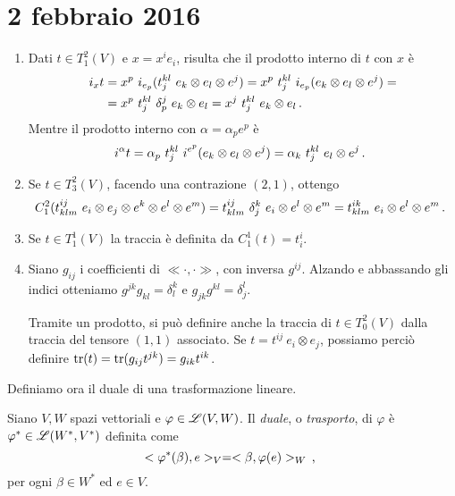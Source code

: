 \chapter{2 febbraio 2016}

\begin{example}
	\begin{enumerate}
		\item Dati $t\in T_1^2(V)$ e $x=x^ie_i$, risulta che il prodotto interno di $t$ con $x$ è 
		\begin{align*}
		i_xt &= x^p\ i_{e_p}(t_j^{kl}\ e_k\otimes e_l\otimes e^j) = x^p\ t_j^{kl}\ i_{e_p} (e_k\otimes e_l\otimes e^j) =\\
		&= x^p\ t_j^{kl}\ \delta_p^j\ e_k\otimes e_l = x^j\ t_j^{kl}\ e_k\otimes e_l \, \text{. }
		\end{align*}
		Mentre il prodotto interno con $\alpha = \alpha_pe^p$ è
		\begin{align*}
		i^\alpha t = \alpha_p\ t_j^{kl}\ i^{e^p}(e_k\otimes e_l\otimes e^j) = \alpha_k\ t_j^{kl}\ e_l\otimes e^j \, \text{. }
		\end{align*}
		
		\item Se $t\in T_3^2(V)$, facendo una contrazione $(2,1)$, ottengo
		\begin{equation*}
			C_1^2 (t_{klm}^{ij}\ e_i\otimes e_j\otimes e^k\otimes e^l\otimes e^m ) = t_{klm}^{ij}\ \delta_j^k\ e_i\otimes e^l\otimes e^m = t_{klm}^{ik}\ e_i\otimes e^l\otimes e^m \, \text{. }
		\end{equation*}
		
		\item Se $t\in T_1^1(V)$ la traccia è definita da $C_1^1(t) = t_i^i$.

		\item Siano $g_{ij}$ i coefficienti di $\ll \cdot, \cdot \gg$, con inversa $g^{ij}$. Alzando e abbassando gli indici otteniamo $g^{jk}g_{kl} = \delta_l^k$ e $g_{jk}g^{kl} = \delta_j^l$.
		
		Tramite un prodotto, si può definire anche la traccia di $t\in T_0^2(V)$ dalla traccia del tensore $(1,1)$ associato. Se $t=t^{ij}\ e_i\otimes e_j$, possiamo perciò definire $\operatorname{tr} (t) = \operatorname{tr} (g_{ij}t^{jk}) = g_{ik}t^{ik}$.
	\end{enumerate}
\end{example}

Definiamo ora il duale di una trasformazione lineare.
\begin{definition}  
	Siano $V,W$ spazi vettoriali e $\varphi \in \mathscr L(V,W)$. Il \emph{duale}, o \emph{trasporto}, di $\varphi$ è $\varphi^* \in \mathscr L(W^*,V^*)$ definita come 
	\begin{equation*} %
		\Scal{\varphi^*(\beta)}{e}_V = \Scal{\beta}{\varphi(e)}_W \virgola 
	\end{equation*}
	per ogni $\beta \in W^*$ ed $e\in V$.
\end{definition}


